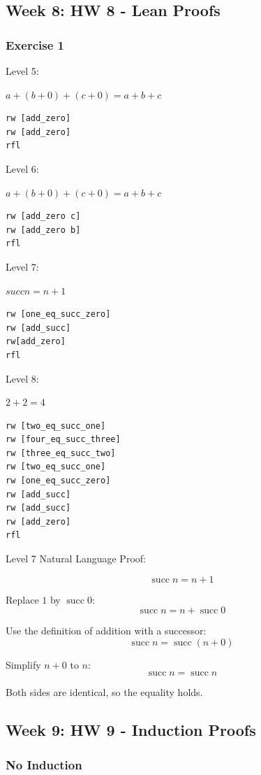 \documentclass{article}
\theoremstyle{theorem}
\theoremstyle{definition}
\theoremstyle{remark}
\begin{document}
\subsection{Week 8: HW 8 - Lean Proofs}

\subsubsection{Exercise 1}

Level 5:

$a+(b+0)+(c+0)=a+b+c$
\begin{verbatim}
rw [add_zero]
rw [add_zero]
rfl
\end{verbatim}

Level 6:

$a+(b+0)+(c+0)=a+b+c$
\begin{verbatim}
rw [add_zero c]
rw [add_zero b]
rfl
\end{verbatim}

Level 7:

$succ n = n + 1$
\begin{verbatim}
rw [one_eq_succ_zero]
rw [add_succ]
rw[add_zero]
rfl
\end{verbatim}

Level 8:

$2+2=4$
\begin{verbatim}
rw [two_eq_succ_one]
rw [four_eq_succ_three]
rw [three_eq_succ_two]
rw [two_eq_succ_one]
rw [one_eq_succ_zero]
rw [add_succ]
rw [add_succ]
rw [add_zero]
rfl
\end{verbatim}

Level 7 Natural Language Proof:

\[
\operatorname{succ} n = n + 1
\]

Replace $1$ by $\operatorname{succ} 0$:
\[
\operatorname{succ} n = n + \operatorname{succ} 0
\]

Use the definition of addition with a successor:
\[
\operatorname{succ} n = \operatorname{succ}(n + 0)
\]

Simplify $n + 0$ to $n$:
\[
\operatorname{succ} n = \operatorname{succ} n
\]

Both sides are identical, so the equality holds.

\subsection{Week 9: HW 9 - Induction Proofs}

\subsubsection{No Induction}
\end{document}
